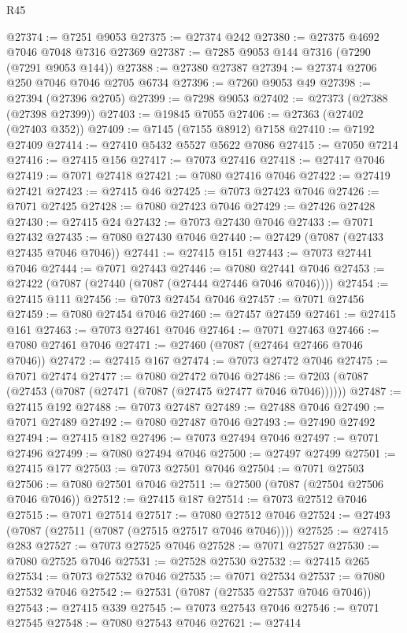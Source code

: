 \begin{lexlean}{R45}
\begin{coremodule}
{@27374 := @7251 @9053
@27375 := @27374 @242
@27380 := @27375 @4692 @7046 @7048 @7316 @27369
@27387 := @7285 @9053 @144 @7316 (@7290 (@7291 @9053 @144))
@27388 := @27380 @27387
@27394 := @27374 @2706 @250 @7046 @7046 @2705 @6734
@27396 := @7260 @9053 @49
@27398 := @27394 (@27396 @2705)
@27399 := @7298 @9053
@27402 := @27373 (@27388 (@27398 @27399))
@27403 := @19845 @7055
@27406 := @27363 (@27402 (@27403 @352))
@27409 := @7145 (@7155 @8912) @7158
@27410 := @7192 @27409
@27414 := @27410 @5432 @5527 @5622 @7086
@27415 := @7050 @7214
@27416 := @27415 @156
@27417 := @7073 @27416
@27418 := @27417 @7046
@27419 := @7071 @27418
@27421 := @7080 @27416 @7046
@27422 := @27419 @27421
@27423 := @27415 @46
@27425 := @7073 @27423 @7046
@27426 := @7071 @27425
@27428 := @7080 @27423 @7046
@27429 := @27426 @27428
@27430 := @27415 @24
@27432 := @7073 @27430 @7046
@27433 := @7071 @27432
@27435 := @7080 @27430 @7046
@27440 := @27429 (@7087 (@27433 @27435 @7046 @7046))
@27441 := @27415 @151
@27443 := @7073 @27441 @7046
@27444 := @7071 @27443
@27446 := @7080 @27441 @7046
@27453 := @27422 (@7087 (@27440 (@7087 (@27444 @27446 @7046 @7046))))
@27454 := @27415 @111
@27456 := @7073 @27454 @7046
@27457 := @7071 @27456
@27459 := @7080 @27454 @7046
@27460 := @27457 @27459
@27461 := @27415 @161
@27463 := @7073 @27461 @7046
@27464 := @7071 @27463
@27466 := @7080 @27461 @7046
@27471 := @27460 (@7087 (@27464 @27466 @7046 @7046))
@27472 := @27415 @167
@27474 := @7073 @27472 @7046
@27475 := @7071 @27474
@27477 := @7080 @27472 @7046
@27486 := @7203 (@7087 (@27453 (@7087 (@27471 (@7087 (@27475 @27477 @7046 @7046))))))
@27487 := @27415 @192
@27488 := @7073 @27487
@27489 := @27488 @7046
@27490 := @7071 @27489
@27492 := @7080 @27487 @7046
@27493 := @27490 @27492
@27494 := @27415 @182
@27496 := @7073 @27494 @7046
@27497 := @7071 @27496
@27499 := @7080 @27494 @7046
@27500 := @27497 @27499
@27501 := @27415 @177
@27503 := @7073 @27501 @7046
@27504 := @7071 @27503
@27506 := @7080 @27501 @7046
@27511 := @27500 (@7087 (@27504 @27506 @7046 @7046))
@27512 := @27415 @187
@27514 := @7073 @27512 @7046
@27515 := @7071 @27514
@27517 := @7080 @27512 @7046
@27524 := @27493 (@7087 (@27511 (@7087 (@27515 @27517 @7046 @7046))))
@27525 := @27415 @283
@27527 := @7073 @27525 @7046
@27528 := @7071 @27527
@27530 := @7080 @27525 @7046
@27531 := @27528 @27530
@27532 := @27415 @265
@27534 := @7073 @27532 @7046
@27535 := @7071 @27534
@27537 := @7080 @27532 @7046
@27542 := @27531 (@7087 (@27535 @27537 @7046 @7046))
@27543 := @27415 @339
@27545 := @7073 @27543 @7046
@27546 := @7071 @27545
@27548 := @7080 @27543 @7046
@27621 := @27414
}
\end{coremodule}
\end{lexlean}
